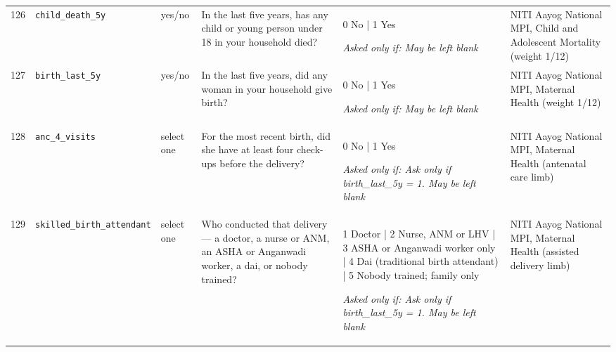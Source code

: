 \documentclass[9pt,a4paper,landscape]{article}
\begin{document}
\begin{longtable}{@{}p{0.5cm}p{3.3cm}p{1.7cm}p{7.3cm}p{5.6cm}p{5.4cm}@{}}
\footnotesize 126 & \footnotesize\texttt{child\_death\_5y} & \scriptsize yes/no & \footnotesize In the last five years, has any child or young person under 18 in your household died?\par\vspace{1pt}{\footnotesize\color{hdr}{\hifont पिछले पाँच साल में क्या आपके घर के 18 साल से छोटे किसी बच्चे या किशोर की मृत्यु हुई?}} & \scriptsize 0 No | 1 Yes\par\vspace{1pt}\textit{Asked only if: May be left blank} & \scriptsize NITI Aayog National MPI, Child and Adolescent Mortality (weight 1/12)\\
\footnotesize 127 & \footnotesize\texttt{birth\_last\_5y} & \scriptsize yes/no & \footnotesize In the last five years, did any woman in your household give birth?\par\vspace{1pt}{\footnotesize\color{hdr}{\hifont पिछले पाँच साल में क्या आपके घर की किसी महिला ने बच्चे को जन्म दिया?}} & \scriptsize 0 No | 1 Yes\par\vspace{1pt}\textit{Asked only if: May be left blank} & \scriptsize NITI Aayog National MPI, Maternal Health (weight 1/12)\\
\footnotesize 128 & \footnotesize\texttt{anc\_4\_visits} & \scriptsize select one & \footnotesize For the most recent birth, did she have at least four check-ups before the delivery?\par\vspace{1pt}{\footnotesize\color{hdr}{\hifont सबसे हाल के जन्म के लिए, क्या डिलीवरी से पहले उनकी कम से कम चार बार जाँच हुई थी?}} & \scriptsize 0 No | 1 Yes\par\vspace{1pt}\textit{Asked only if: Ask only if birth\_last\_5y = 1. May be left blank} & \scriptsize NITI Aayog National MPI, Maternal Health (antenatal care limb)\\
\footnotesize 129 & \footnotesize\texttt{skilled\_birth\_attendant} & \scriptsize select one & \footnotesize Who conducted that delivery — a doctor, a nurse or ANM, an ASHA or Anganwadi worker, a dai, or nobody trained?\par\vspace{1pt}{\footnotesize\color{hdr}{\hifont वह डिलीवरी किसने कराई — डॉक्टर, नर्स या एएनएम, आशा या आँगनवाड़ी कार्यकर्ता, दाई, या कोई प्रशिक्षित व्यक्ति नहीं?}} & \scriptsize 1 Doctor | 2 Nurse, ANM or LHV | 3 ASHA or Anganwadi worker only | 4 Dai (traditional birth attendant) | 5 Nobody trained; family only\par\vspace{1pt}\textit{Asked only if: Ask only if birth\_last\_5y = 1. May be left blank} & \scriptsize NITI Aayog National MPI, Maternal Health (assisted delivery limb)\\
\bottomrule\end{longtable}\vspace{6pt}
\end{document}
